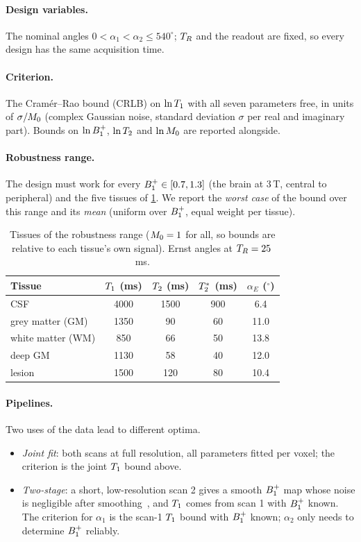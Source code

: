 \paragraph{Design variables.} The nominal angles $0<\alpha_1<\alpha_2\le540^\circ$; $T_R$ and the
readout are fixed, so every design has the same acquisition time.

\paragraph{Criterion.} The Cram\'er--Rao bound (CRLB) on $\ln T_1$ with all seven parameters free,
in units of $\sigma/M_0$ (complex Gaussian noise, standard deviation $\sigma$ per real and
imaginary part). Bounds on $\ln B_1^{+}$, $\ln T_2$ and $\ln M_0$ are reported alongside.

\paragraph{Robustness range.} The design must work for every $B_1^{+}\in[0.7,1.3]$ (the brain at
3\,T, central to peripheral) and the five tissues of \cref{tab:tissues}. We report the
\emph{worst case} of the bound over this range and its \emph{mean} (uniform over $B_1^{+}$, equal
weight per tissue).

\begin{table}[!htbp]
\centering
\caption{Tissues of the robustness range ($M_0=1$ for all, so bounds are relative to each
tissue's own signal). Ernst angles at $T_R=25$\,ms.}
\label{tab:tissues}
\small
\begin{tabular}{lcccc}
\toprule
Tissue & $T_1$ (ms) & $T_2$ (ms) & $T_2^{*}$ (ms) & $\alpha_E$ ($^\circ$)\\
\midrule
CSF & 4000 & 1500 & 900 & 6.4\\
grey matter (GM) & 1350 & 90 & 60 & 11.0\\
white matter (WM) & 850 & 66 & 50 & 13.8\\
deep GM & 1130 & 58 & 40 & 12.0\\
lesion & 1500 & 120 & 80 & 10.4\\
\bottomrule
\end{tabular}
\end{table}

\paragraph{Pipelines.} Two uses of the data lead to different optima.
\begin{itemize}
\item \emph{Joint fit}: both scans at full resolution, all parameters fitted per voxel; the
  criterion is the joint $T_1$ bound above.
\item \emph{Two-stage}: a short, low-resolution scan 2 gives a smooth $B_1^{+}$ map whose noise is
  negligible after smoothing~\cite[Sec.~5]{technote}, and $T_1$ comes from scan 1 with $B_1^{+}$
  known. The criterion for $\alpha_1$ is the scan-1 $T_1$ bound with $B_1^{+}$ known; $\alpha_2$ only needs to
  determine $B_1^{+}$ reliably.
\end{itemize}

